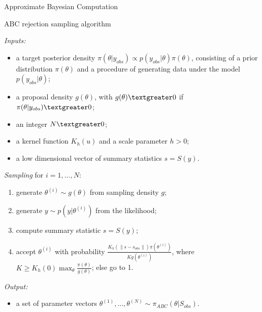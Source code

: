 \documentclass{beamer}
\begin{document}
\begin{section}{Approximate Bayesian Computation}
	\begin{frame}{ABC rejection sampling algorithm}

		 {
			\emph{Inputs:}
			\begin{itemize}
				\item a target posterior density $\pi(\theta | y_{obs}) \propto p(y_{obs}|\theta) \pi(\theta)$, consisting of a prior distribution $\pi(\theta)$ and a procedure of generating data under the model $p(y_{obs}|\theta)$;
				\item a proposal density $g(\theta)$, with $g(\theta)\textgreater 0 $ if $\pi(\theta | y_{obs}) \textgreater 0$;
				\item an integer $N \textgreater0$;
				\item a kernel function $K_h(u)$ and a scale parameter $h > 0$;
				\item a low dimensional vector of summary statistics $s=S(y)$.
			\end{itemize}
		}
		\only<2> {
			\emph{Sampling} for $i= 1,..., N$:
			\begin{enumerate}
				\item generate $\theta ^ {(i)} \sim g(\theta)$ from sampling density $g$;
				\item generate $ y \sim p(y|\theta ^ {(i)})$ from the likelihood;
				\item compute summary statistic $s = S(y)$;
				\item accept $\theta ^ {(i)}$ with probability $\frac{K_h(\parallel s-s_{obs}\parallel)   \pi(\theta ^ {(i)})}{K g(\theta ^ {(i)})}$, where $K \geq K_h(0)\max_{\theta}{\frac{\pi(\theta)}{g(\theta)}}$; else go to 1.
			\end{enumerate}
		
			\emph{Output:}
			\begin{itemize}
				\item a set of parameter vectors $\theta ^ {(1)},..., \theta ^ {(N)} \sim \pi_{ABC}(\theta |S_{obs})$.
			\end{itemize}
		}
		

	\end{frame}
\end{section}
\end{document}
